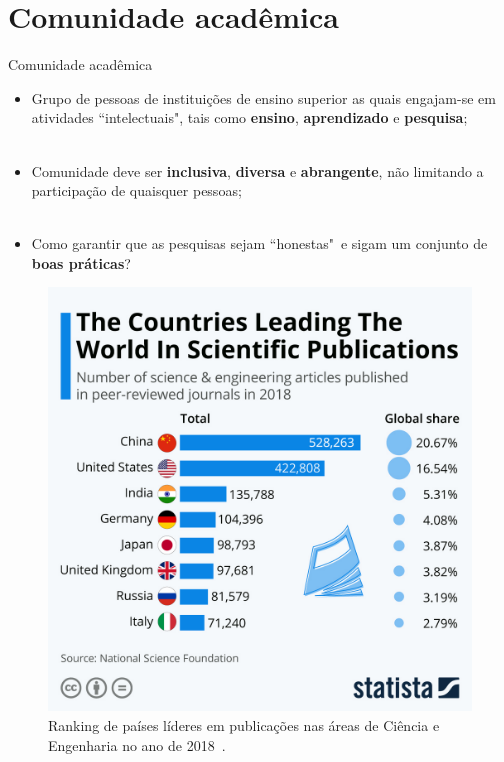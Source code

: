 \section{Comunidade acadêmica}
\label{s.community}

\begin{frame}{Comunidade acadêmica}
	\justify 
	\begin{itemize}
		\item<1> Grupo de pessoas de instituições de ensino superior as quais engajam-se em atividades ``intelectuais", tais como \textbf{ensino}, \textbf{aprendizado} e \textbf{pesquisa};
		\\~\\
		\item<2> Comunidade deve ser \textbf{inclusiva}, \textbf{diversa} e \textbf{abrangente}, não limitando a participação de quaisquer pessoas;
		\\~\\
		\item<3> Como garantir que as pesquisas sejam ``honestas"~e sigam um conjunto de \textbf{boas práticas}?
	\end{itemize}
\end{frame}

\begin{frame}{}
	\centering
	\begin{figure}
		\includegraphics[scale=0.125]{figs/lead_country_papers.png}
		\caption{Ranking de países líderes em publicações nas áreas de Ciência e Engenharia no ano de 2018~\cite{Statista:18}.}
		\label{f.lead_country_papers}
	\end{figure}
\end{frame}

